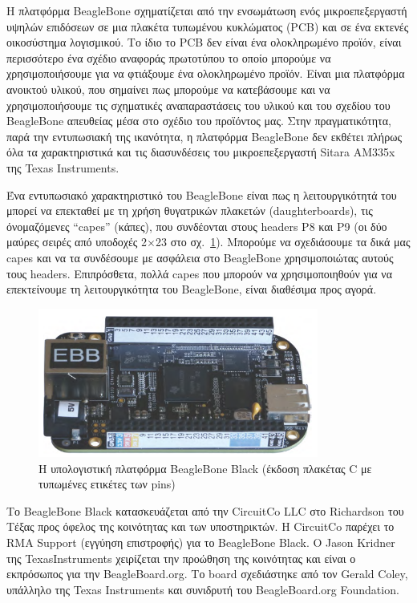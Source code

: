 \documentclass[12pt, a4paper, oneside]{report}
\begin{document}
Η πλατφόρμα BeagleBone σχηματίζεται από την ενσωμάτωση ενός μικροεπεξεργαστή υψηλών επιδόσεων σε μια πλακέτα τυπωμένου κυκλώματος (PCB) και σε ένα εκτενές οικοσύστημα λογισμικού. Το ίδιο το PCB δεν είναι ένα ολοκληρωμένο προϊόν, είναι περισσότερο ένα σχέδιο αναφοράς πρωτοτύπου το οποίο μπορούμε να χρησιμοποιήσουμε για να φτιάξουμε ένα ολοκληρωμένο προϊόν. Είναι μια πλατφόρμα ανοικτού υλικού, που σημαίνει πως μπορούμε να κατεβάσουμε και να χρησιμοποιήσουμε τις σχηματικές αναπαραστάσεις του υλικού και του σχεδίου του BeagleBone απευθείας μέσα στο σχέδιο του προϊόντος μας. Στην πραγματικότητα, παρά την εντυπωσιακή της ικανότητα, η πλατφόρμα BeagleBone δεν εκθέτει πλήρως όλα τα χαρακτηριστικά και τις διασυνδέσεις του μικροεπεξεργαστή Sitara AM335x της Texas Instruments.

Ένα εντυπωσιακό χαρακτηριστικό του BeagleBone είναι πως η λειτουργικότητά του μπορεί να επεκταθεί με τη χρήση θυγατρικών πλακετών (daughterboards), τις όνομαζόμενες ``capes'' (κάπες), που συνδέονται στους headers P8 και P9 (οι δύο μαύρες σειρές από υποδοχές 2$\times$23 στο σχ.~\ref{eik19}). Μπορούμε να σχεδιάσουμε τα δικά μας capes και να τα συνδέσουμε με ασφάλεια στο BeagleBone χρησιμοποιώτας αυτούς τους headers. Επιπρόσθετα, πολλά capes που μπορούν να χρησιμοποιηθούν για να επεκτείνουμε τη λειτουργικότητα του BeagleBone, είναι διαθέσιμα προς αγορά.

\begin{figure}[!ht]
\centering
\includegraphics[width=0.82\textwidth]{eikona_19}
\caption[Η υπολογιστική πλατφόρμα BeagleBone Black]{Η υπολογιστική πλατφόρμα BeagleBone Black (έκδοση πλακέτας C με τυπωμένες ετικέτες των pins)\cite{46}}\label{eik19}
\end{figure}

Το BeagleBone Black κατασκευάζεται από την CircuitCo LLC στο Richardson του Τέξας προς όφελος της κοινότητας και των υποστηρικτών. Η CircuitCo παρέχει το RMA Support (εγγύηση επιστροφής) για το BeagleBone Black. O Jason Kridner της TexasInstruments χειρίζεται την προώθηση της κοινότητας και είναι ο εκπρόσωπος για την BeagleBoard.org. Το board σχεδιάστηκε από τον Gerald Coley, υπάλληλο της Texas Instruments και συνιδρυτή του BeagleBoard.org Foundation.
\end{document}
